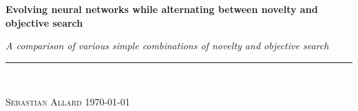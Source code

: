 
\vspace*{5cm}

\begin{flushleft}
\Huge \textsf{\textbf{Evolving neural networks while alternating between novelty and objective search}}
\end{flushleft}

\emph{\large A comparison of various simple combinations of novelty and objective search} \hfill \\
\rule{\textwidth}{1pt} \\

\begin{flushright}
\textsc{Sebastian Allard} \quad \today
\end{flushright}


\thispagestyle{empty}
